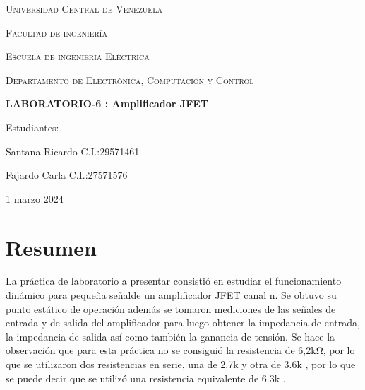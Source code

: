 \documentclass[12pt, a4paper]{article}
\begin{document}
    \begin{titlepage}
        \centering
        {\scshape\Large Universidad Central de Venezuela \par}
        {\scshape\Large Facultad de ingeniería \par}
        {\scshape\Large Escuela de ingeniería Eléctrica \par}
        {\scshape\Large Departamento de Electrónica, Computación y Control \par}

        \vspace{6cm}
        {\Large\bfseries LABORATORIO-6 : Amplificador JFET\par}
        \vspace{6cm}

        \vfill
        \begin{flushright}
            Estudiantes:\par
            Santana Ricardo C.I.:29571461 \par
            Fajardo Carla C.I.:27571576
            \vspace{1cm}  
        \end{flushright}
        \vfill
        {\large 1 marzo 2024 \par}
    \end{titlepage}

    \tableofcontents

    \newpage

    \section{Resumen}

    La práctica de laboratorio a presentar consistió en estudiar el funcionamiento dinámico para pequeña señalde un amplificador JFET canal n. Se obtuvo su punto estático de operación además se tomaron mediciones de las señales de entrada y de salida del amplificador para luego obtener la impedancia de entrada, la impedancia de salida así como también la ganancia de tensión. Se hace la observación que para esta práctica no se consiguió la resistencia de 6,2kΩ, por lo que se utilizaron dos resistencias en serie, una de 2.7k \Omega y otra de 3.6k \Omega, por lo que se puede decir que se utilizó una resistencia equivalente de 6.3k \Omega .
    
\end{document}
